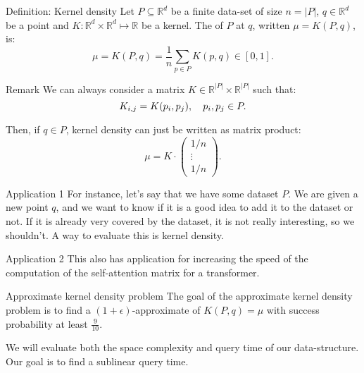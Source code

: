 \documentclass[a4paper]{article}
\begin{document}
\begin{parag}{Definition: Kernel density}
    Let $P \subseteq \mathbb{R}^d$ be a finite data-set of size $n = \left|P\right|$, $q \in \mathbb{R}^d$ be a point and $K: \mathbb{R}^d \times \mathbb{R}^d \mapsto \mathbb{R}$ be a kernel. The  of $P$ at $q$, written $\mu = K\left(P, q\right)$, is: 
    \[\mu = K\left(P, q\right) = \frac{1}{n} \sum_{p \in P} K\left(p, q\right) \in \left[0, 1\right].\]


    \begin{subparag}{Remark}
        We can always consider a matrix $K \in \mathbb{R}^{\left|P\right|} \times \mathbb{R}^{\left|P\right|}$ such that: 
        \[K_{i, j} = K\left(p_i, p_j\right), \mathspace p_i, p_j \in P.\]

        Then, if $q \in P$, kernel density can just be written as matrix product:
        \[\mu = K\cdot  \begin{pmatrix} 1/n \\ \vdots \\ 1/n \end{pmatrix}.\]
    \end{subparag}

    \begin{subparag}{Application 1}
        For instance, let's say that we have some dataset $P$. We are given a new point $q$, and we want to know if it is a good idea to add it to the dataset or not. If it is already very covered by the dataset, it is not really interesting, so we shouldn't. A way to evaluate this is kernel density.
    \end{subparag}

    \begin{subparag}{Application 2}
        This also has application for increasing the speed of the computation of the self-attention matrix for a transformer.
    \end{subparag}
\end{parag}

\begin{parag}{Approximate kernel density problem}
    The goal of the approximate kernel density problem is to find a $\left(1+\epsilon\right)$-approximate of $K\left(P, q\right) = \mu$ with success probability at least $\frac{9}{10}$.

    We will evaluate both the space complexity and query time of our data-structure. Our goal is to find a sublinear query time.
\end{parag}
\end{document}
